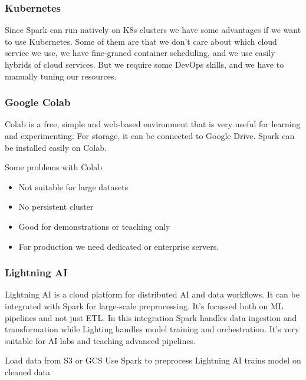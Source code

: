 \subsubsection{Kubernetes}

Since Spark can run natively on K8s clusters we have some advantages if we want to use Kubernetes. Some of them are that we don't care about which cloud service we use, we have fine-graned container scheduling, and we use easily hybrids of cloud services. But we require some DevOps skills, and we have to manually tuning our resources. 


\subsubsection{Google Colab}


Colab is a free, simple and web-based environment that is very useful for learning and experimenting. For storage, it can be connected to Google Drive. Spark can be installed easily on Colab.

\vspace{10pt}

Some problems with Colab
\begin{itemize}
    \item Not suitable for large datasets
    \item No persistent cluster
    \item Good for demonstrations or teaching only
    \item For production we need dedicated or enterprise servers.
\end{itemize}


\subsubsection{Lightning AI}

Lightning AI is a cloud platform for distributed AI and data workflows. It can be integrated with Spark for large-scale preprocessing. It's focussed both on ML pipelines and not just ETL. In this integration Spark handles data ingestion and transformation while Lighting handles model training and orchestration. It's very suitable for AI labs and teaching advanced pipelines. 

\vspace{10pt}

Load data from S3 or GCS \ra Use Spark to preprocess \ra Lightning AI trains model on cleaned data

\vspace{10pt}

